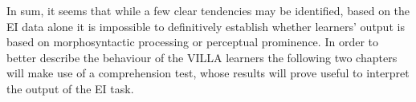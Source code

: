 In sum, it seems that while a few clear tendencies may be identified, based on the EI data alone it is impossible to definitively establish whether learners' output is based on morphosyntactic processing or perceptual prominence. In order to better describe the behaviour of the VILLA learners the following two chapters will make use of a comprehension test, whose results will prove useful to interpret the output of the EI task.
